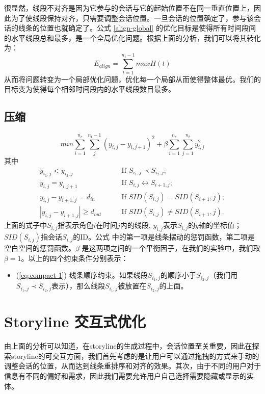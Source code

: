 很显然，线段不对齐是因为它参与的会话与它的起始位置不在同一垂直位置上，因此为了使线段保持对齐，只需要调整会话位置。一旦会话的位置确定了，参与该会话的线条的位置也就确定了。公式 \ref{align-global} 的优化目标是使得所有时间段间的水平线段总和最多，是一个全局优化问题。根据上面的分析，我们可以将其转化为：
\begin{equation}
\label{align-local}
E_{align} = \sum_{t=1}^{n_t-1} max H\left(t\right)
\end{equation}
从而将问题转变为一个局部优化问题，优化每一个局部从而使得整体最优。我们的目标变为使得每个相邻时间段内的水平线段数目最多。

\subsection{压缩} 
\begin{equation}
min \sum_{i=1}^{n_e} \sum_j^{n_t-1} \left(y_{i,j} - y_{i, j+1} \right)^2 + \beta \sum_{i=1}^{n_e} \sum_{j=1}^{n_t} y_{i,j}^2
\end{equation}
\label{eq:compact}
其中
\begin{subequations}
\begin{align}
	y_{i_1,j} < y_{i_2, j} & \qquad \text{If  } S_{i_1,j} \prec S_{i_2,j}; \label{eq:compact-1}\\
	y_{i,j} = y_{i,j+1} & \qquad \text{If  } S_{i,j} \leftrightarrow S_{i+1, j}; \label{eq:compact-2}\\
	y_{i,j} - y_{i+1,j} = d_{in} & \qquad \text{If  } SID(S_{i,j}) = SID(S_{i+1}, j); \label{eq:compact-3}\\
	\left|y_{i,j} - y_{i+1,j}\right| \geq d_{out} & \qquad \text{If  } SID(S_{i,j}) \neq SID(S_{i+1}, j). \label{eq:compact-4}
\end{align}
\end{subequations}
上面的式子中$S_{i,j}$指表示角色$i$在时间$j$内的线段, $y_{i,j}$表示$S_{i,j}$的$y$轴的坐标值；$SID(S_{i,j})$指会话$S_{i,j}$的ID。公式 \label{eq:compact} 中的第一项是线条摆动的惩罚函数，第二项是空白空间的惩罚函数。$\beta$ 是这两项之间的一个平衡因子，在我们的实验中，我们取 $\beta = 1$。以上的四个约束条件分别表示：
\begin{itemize}
\item (\ref{eq:compact-1}) 线条顺序约束。如果线段$S_{i_1,j}$的顺序小于$S_{i_2,j}$（我们用$S_{i_1,j} \prec S_{i_2,j}$表示），那么线段$S_{i_1,j}$被放置在$S_{i_2,j}$的上面。
\end{itemize}

\section{Storyline 交互式优化}
由上面的分析可以知道，在storyline的生成过程中，会话位置至关重要，因此在探索storyline的可交互方面，我们首先考虑的是让用户可以通过拖拽的方式来手动的调整会话的位置，从而达到线条重排序和对齐的效果。其次，由于不同的用户对于信息有不同的偏好和需求，因此我们需要允许用户自己选择需要隐藏或显示的实体。

